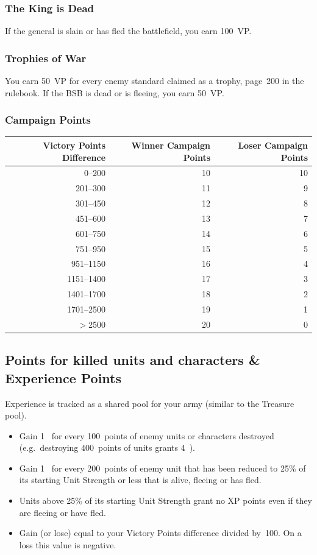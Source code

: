 \subsubsection{The King is Dead}

If the general is slain or has fled the battlefield, you earn 100~VP.

\subsubsection{Trophies of War}

You earn 50~VP for every enemy standard claimed as a trophy, page~200 in the rulebook. If the BSB is dead or is fleeing, you earn 50~VP.

\subsubsection{Campaign Points}
\begin{center}
\renewcommand{\arraystretch}{1.2}
\begin{tabular}{@{}rrr@{}}
\toprule
\textbf{Victory Points Difference} & \textbf{Winner Campaign Points} & \textbf{Loser Campaign Points} \\
\midrule
0--200     & 10 & 10 \\
201--300   & 11 & 9 \\
301--450   & 12 & 8 \\
451--600   & 13 & 7 \\
601--750   & 14 & 6 \\
751--950   & 15 & 5 \\
951--1150  & 16 & 4 \\
1151--1400 & 17 & 3 \\
1401--1700 & 18 & 2 \\
1701--2500 & 19 & 1 \\
$>$2500    & 20 & 0 \\
\bottomrule
\end{tabular}
\end{center}

\subsection{Points for killed units and characters \& Experience Points}

Experience is tracked as a shared \XPshort{} pool for your army (similar to the Treasure pool).

\begin{itemize}
  \item Gain 1~\XPshort{} for every 100~points of enemy units or characters destroyed
    (e.g.\ destroying 400~points of units grants 4~\XPshort).
  \item Gain 1~\XPshort{} for every 200~points of enemy unit that has been reduced to 25\% of its starting Unit Strength or less that is alive, fleeing or has fled.
  \item Units above 25\% of its starting Unit Strength grant no XP points even if they are fleeing or have fled.
  \item Gain (or lose) \XPshort{} equal to your Victory Points difference divided by~100.
    On a loss this value is negative.
\end{itemize}

